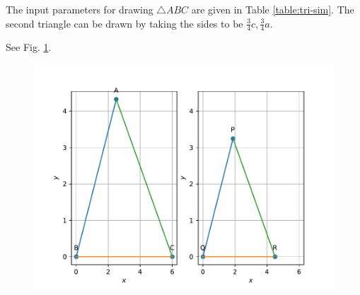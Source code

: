 \documentclass[journal,12pt,twocolumn]{IEEEtran}
\begin{document}
\begin{enumerate}
	    \solution The input parameters for drawing $\triangle ABC$ are given in Table 
\eqref{table:tri-sim}.  The second triangle can be drawn by taking the sides to be $\frac{3}{4}c, \frac{3}{4}a$.
\begin{table}[ht!]
	
\caption{}
\label{table:tri-sim}	
\end{table}
    See Fig. 
	  \ref{fig:matrix-10-12.pdf}.
  \begin{figure}
	  \centering 
	  \includegraphics[width=\columnwidth]{figs/matrix-10-12.pdf}
	  \caption{}
	  \label{fig:matrix-10-12.pdf}
	  \end{figure}
    

\end{enumerate}
\end{document}
